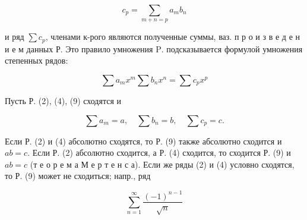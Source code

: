 \documentclass[10pt]{article}
\begin{document}
\[

c_{p}=\sum_{m+n=p} a_{m} b_{n}

\]



и ряд $\sum c_{p}$, членами к-рого являются полученные суммы, ваз. п р о и з в е д е н и е м данных Р. Это правило умножения $\mathrm{P}$. подсказывается формулой умножения степенных рядов:



\[

\sum a_{m} x^{m} \sum b_{n} x^{n}=\sum c_{p} x^{p}

\]



Пусть Р. (2), (4), (9) сходятся и



\[

\sum a_{m}=a, \quad \sum b_{n}=b, \quad \sum c_{p}=c .

\]



Если Р. (2) и (4) абсолютно сходятся, то Р. (9) также абсолютно сходится и $a b=c$. Если Р. (2) абсолютно сходится, а Р. (4) сходится, то сходится Р. (9) и $a b=c$ (т е о р е м а М е р т е н с а). Если же ряды (2) и (4) условно сходятся, то Р. (9) может не сходиться; напр., ряд



\[

\sum_{n=1}^{\infty} \frac{(-1)^{n-1}}{\sqrt{n}}

\]
\end{document}
